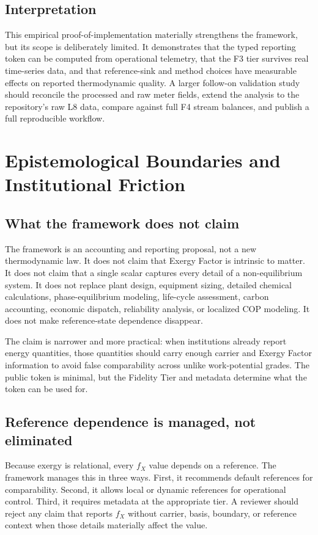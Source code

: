 \documentclass[11pt]{article}
\newcommand{\fx}{f_X}
\begin{document}
\subsection{Interpretation}

This empirical proof-of-implementation materially strengthens the framework, but its scope is deliberately limited. It demonstrates that the typed reporting token can be computed from operational telemetry, that the F3 tier survives real time-series data, and that reference-sink and method choices have measurable effects on reported thermodynamic quality. A larger follow-on validation study should reconcile the processed and raw meter fields, extend the analysis to the repository's raw L8 data, compare against full F4 stream balances, and publish a full reproducible workflow.

\section{Epistemological Boundaries and Institutional Friction}

\subsection{What the framework does not claim}

The framework is an accounting and reporting proposal, not a new thermodynamic law. It does not claim that Exergy Factor is intrinsic to matter. It does not claim that a single scalar captures every detail of a non-equilibrium system. It does not replace plant design, equipment sizing, detailed chemical calculations, phase-equilibrium modeling, life-cycle assessment, carbon accounting, economic dispatch, reliability analysis, or localized COP modeling. It does not make reference-state dependence disappear.

The claim is narrower and more practical: when institutions already report energy quantities, those quantities should carry enough carrier and Exergy Factor information to avoid false comparability across unlike work-potential grades. The public token is minimal, but the Fidelity Tier and metadata determine what the token can be used for.

\subsection{Reference dependence is managed, not eliminated}

Because exergy is relational, every $\fx$ value depends on a reference. The framework manages this in three ways. First, it recommends default references for comparability. Second, it allows local or dynamic references for operational control. Third, it requires metadata at the appropriate tier. A reviewer should reject any claim that reports $\fx$ without carrier, basis, boundary, or reference context when those details materially affect the value.
\end{document}
